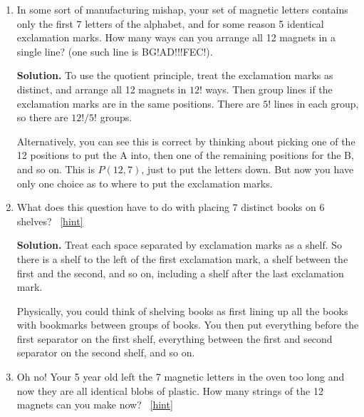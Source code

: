 \documentclass{book}
\begin{document}
\setcounter{project}{125}
\addtocounter{project}{-1}
\begin{activity}[]\label{activity-118}
\leavevmode%
\begin{enumerate}[font=\bfseries,label=(\alph*),ref=\alph*]
\item\label{task-170} \hypertarget{p-889}{}%
In some sort of manufacturing mishap, your set of magnetic letters contains only the first 7 letters of the alphabet, and for some reason 5 identical exclamation marks.  How many ways can you arrange all 12 magnets in a single line?  (one such line is BG!AD!!!FEC!).%
\par\smallskip%
\noindent\textbf{Solution.}\hypertarget{solution-96}{}\quad%
\hypertarget{p-890}{}%
To use the quotient principle, treat the exclamation marks as distinct, and arrange all 12 magnets in \(12!\) ways.  Then group lines if the exclamation marks are in the same positions.  There are \(5!\) lines in each group, so there are \(12!/5!\) groups.%
\par
\hypertarget{p-891}{}%
Alternatively, you can see this is correct by thinking about picking one of the 12 positions to put the A into, then one of the remaining positions for the B, and so on.  This is \(P(12,7)\), just to put the letters down.  But now you have only one choice as to where to put the exclamation marks.%
\item\label{task-171} \hypertarget{p-892}{}%
What does this question have to do with placing \(7\) distinct books on \(6\) shelves?%
~\hfill{\tiny\hyperlink{a-125.b}{[hint]}\hypertarget{q-125.b}{}}\par\smallskip%
\noindent\textbf{Solution.}\hypertarget{solution-97}{}\quad%
\hypertarget{p-894}{}%
Treat each space separated by exclamation marks as a shelf.  So there is a shelf to the left of the first exclamation mark, a shelf between the first and the second, and so on, including a shelf after the last exclamation mark.%
\par
\hypertarget{p-895}{}%
Physically, you could think of shelving books as first lining up all the books with bookmarks between groups of books.  You then put everything before the first separator on the first shelf, everything between the first and second separator on the second shelf, and so on.%
\item\label{task-172} \hypertarget{p-896}{}%
Oh no! Your 5 year old left the 7 magnetic letters in the oven too long and now they are all identical blobs of plastic.  How many strings of the 12 magnets can you make now?%
~\hfill{\tiny\hyperlink{a-125.c}{[hint]}\hypertarget{q-125.c}{}}\par\smallskip%

\end{enumerate}
\end{activity}
\end{document}
